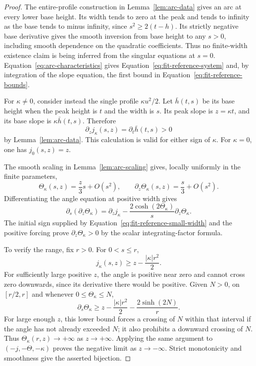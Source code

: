 \begin{proof}
The entire-profile construction in Lemma~\ref{lem:arc-data} gives an
arc at every lower base height.  Its width tends to zero at the peak
and tends to infinity as the base tends to minus infinity, since
\(s^2\ge 2(t-h)\).  Its strictly negative base derivative gives the
smooth inversion from base height to any \(s>0\), including smooth
dependence on the quadratic coefficients.  Thus no finite-width
existence claim is being inferred from the singular equations at
\(s=0\).  Equation~\eqref{eq:arc-characteristics} gives
Equation~\eqref{eq:fit-reference-system} and, by integration of the
slope equation, the first bound in Equation~\eqref{eq:fit-reference-bounds}.

For \(\kappa\ne0\), consider instead the single profile
\(\kappa u^2/2\).  Let \(\bar h(t,s)\) be its base height when the peak
height is \(t\) and the width is \(s\).  Its peak slope is \(z=\kappa t\),
and its base slope is \(\kappa\bar h(t,s)\).  Therefore
\[
 \partial_z j_\kappa(s,z)=\partial_t\bar h(t,s)>0
\]
by Lemma~\ref{lem:arc-data}.  This calculation is valid for either
sign of \(\kappa\).  For \(\kappa=0\), one has \(j_0(s,z)=z\).

The smooth scaling in Lemma~\ref{lem:arc-scaling} gives, locally
uniformly in the finite parameters,
\begin{equation}\label{eq:fit-reference-small-width}
 \Theta_\kappa(s,z)=\frac{z}{3}s+O(s^2),\qquad
 \partial_z\Theta_\kappa(s,z)=\frac{s}{3}+O(s^2).
\end{equation}
Differentiating the angle equation at positive width gives
\[
 \partial_s(\partial_z\Theta_\kappa)
  =\partial_z j_\kappa
     -\frac{2\cosh(2\Theta_\kappa)}s\partial_z\Theta_\kappa.
\]
The initial sign supplied by Equation~\eqref{eq:fit-reference-small-width}
and the positive forcing prove \(\partial_z\Theta_\kappa>0\) by the
scalar integrating-factor formula.

To verify the range, fix \(r>0\).  For \(0<s\le r\),
\[
 j_\kappa(s,z)\ge z-\frac{|\kappa|r^2}{2}.
\]
For sufficiently large positive \(z\), the angle is positive near
zero and cannot cross zero downwards, since its derivative there
would be positive.  Given \(N>0\), on \([r/2,r]\) and whenever
\(0\le\Theta_\kappa\le N\),
\[
 \partial_s\Theta_\kappa
 \ge z-\frac{|\kappa|r^2}{2}-\frac{2\sinh(2N)}r.
\]
For large enough \(z\), this lower bound forces a crossing of \(N\)
within that interval if the angle has not already exceeded \(N\);
it also prohibits a downward crossing of \(N\).  Thus
\(\Theta_\kappa(r,z)\to+\infty\) as \(z\to+\infty\).
Applying the same argument to \((-j,-\Theta,-\kappa)\) proves the
negative limit as \(z\to-\infty\).  Strict monotonicity and smoothness
give the asserted bijection.


\end{proof}

